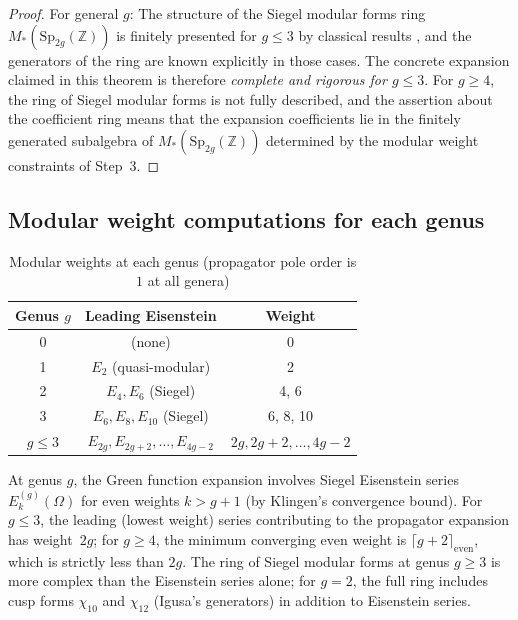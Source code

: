 \begin{proof}
For general $g$: The structure of the Siegel modular forms ring $M_*(\mathrm{Sp}_{2g}(\mathbb{Z}))$ is finitely presented for $g \leq 3$ by classical results \cite{Freitag83}, and the generators of the ring are known explicitly in those cases.  The concrete expansion claimed in this theorem is therefore \emph{complete and rigorous for $g \leq 3$}.  For $g \geq 4$, the ring of Siegel modular forms is not fully described, and the assertion about the coefficient ring means that the expansion coefficients lie in the finitely generated subalgebra of $M_*(\mathrm{Sp}_{2g}(\mathbb{Z}))$ determined by the modular weight constraints of Step~3.
\end{proof}

\subsection{Modular weight computations for each genus}
\label{subsec:modular-weights-all-genus}

\begin{table}[ht]
\centering
\caption{Modular weights at each genus (propagator pole order is $1$ at all genera)}
\label{tab:modular-weights}
\begin{tabular}{|c|c|c|}
\hline
\textbf{Genus $g$} & \textbf{Leading Eisenstein} & \textbf{Weight} \\
\hline
0 & (none) & 0 \\
\hline
1 & $E_2$ (quasi-modular) & 2 \\
\hline
2 & $E_4, E_6$ (Siegel) & 4, 6 \\
\hline
3 & $E_6, E_8, E_{10}$ (Siegel) & 6, 8, 10 \\
\hline
$g \leq 3$ & $E_{2g}, E_{2g+2}, \ldots, E_{4g-2}$ & $2g, 2g+2, \ldots, 4g-2$ \\
\hline
\end{tabular}
\end{table}

\begin{proposition}\label{prop:modular-weight-formula}
At genus $g$, the Green function expansion involves Siegel Eisenstein series
$E_k^{(g)}(\Omega)$ for even weights $k > g+1$ (by Klingen's convergence
bound).  For $g \leq 3$, the leading (lowest weight) series contributing to the propagator
expansion has weight~$2g$; for $g \geq 4$, the minimum converging even weight is $\lceil g+2 \rceil_{\mathrm{even}}$, which is strictly less than $2g$.  The ring
of Siegel modular forms at genus $g \geq 3$ is more complex than the
Eisenstein series alone; for $g = 2$, the full ring includes cusp forms
$\chi_{10}$ and $\chi_{12}$ (Igusa's generators) in addition to Eisenstein
series.

\end{proposition}

